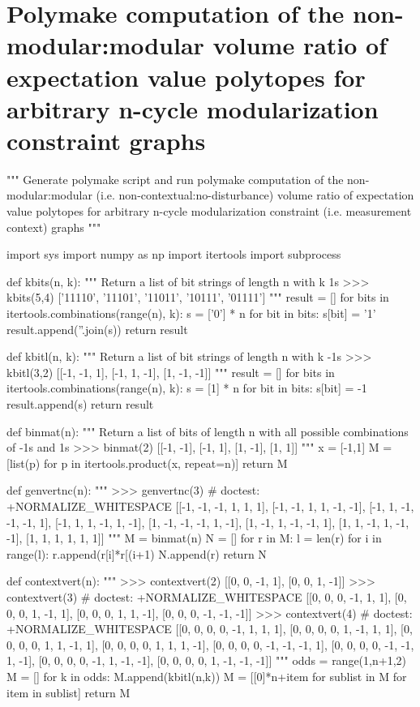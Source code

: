 \documentclass[10pt]{article}
\begin{document}
\section*{Polymake computation of the non-modular:modular volume ratio of expectation value polytopes for arbitrary n-cycle modularization constraint graphs}
\begin{python}
"""
Generate polymake script and run polymake computation of the
non-modular:modular (i.e. non-contextual:no-disturbance) volume ratio
of expectation value polytopes for arbitrary n-cycle modularization
constraint (i.e. measurement context) graphs
"""

import sys
import numpy as np
import itertools
import subprocess

def kbits(n, k):
    """
    Return a list of bit strings of length n with k 1s
    >>> kbits(5,4)
    ['11110', '11101', '11011', '10111', '01111']
    """
    result = []
    for bits in itertools.combinations(range(n), k):
        s = ['0'] * n
        for bit in bits:
            s[bit] = '1'
        result.append(''.join(s))
    return result

def kbitl(n, k):
    """
    Return a list of bit strings of length n with k -1s
    >>> kbitl(3,2)
    [[-1, -1, 1], [-1, 1, -1], [1, -1, -1]]
    """
    result = []
    for bits in itertools.combinations(range(n), k):
        s = [1] * n
        for bit in bits:
            s[bit] = -1
        result.append(s)
    return result

def binmat(n):
    """
    Return a list of bits of length n with all possible
    combinations of -1s and 1s
    >>> binmat(2)
    [[-1, -1], [-1, 1], [1, -1], [1, 1]]
    """
    x = [-1,1]
    M = [list(p) for p in itertools.product(x, repeat=n)]
    return M

def genvertnc(n):
    """
    >>> genvertnc(3) # doctest: +NORMALIZE_WHITESPACE
    [[-1, -1, -1, 1, 1, 1], [-1, -1, 1, 1, -1, -1],
    [-1, 1, -1, -1, -1, 1], [-1, 1, 1, -1, 1, -1],
    [1, -1, -1, -1, 1, -1], [1, -1, 1, -1, -1, 1],
    [1, 1, -1, 1, -1, -1], [1, 1, 1, 1, 1, 1]]
    """
    M = binmat(n)
    N = []
    for r in M:
        l = len(r)
        for i in range(l):
            r.append(r[i]*r[(i+1) %
        N.append(r)
    return N

def contextvert(n):
    """
    >>> contextvert(2)
    [[0, 0, -1, 1], [0, 0, 1, -1]]
    >>> contextvert(3) # doctest: +NORMALIZE_WHITESPACE
    [[0, 0, 0, -1, 1, 1], [0, 0, 0, 1, -1, 1],
    [0, 0, 0, 1, 1, -1], [0, 0, 0, -1, -1, -1]]
    >>> contextvert(4) # doctest: +NORMALIZE_WHITESPACE
    [[0, 0, 0, 0, -1, 1, 1, 1], [0, 0, 0, 0, 1, -1, 1, 1],
    [0, 0, 0, 0, 1, 1, -1, 1], [0, 0, 0, 0, 1, 1, 1, -1],
    [0, 0, 0, 0, -1, -1, -1, 1], [0, 0, 0, 0, -1, -1, 1, -1],
    [0, 0, 0, 0, -1, 1, -1, -1], [0, 0, 0, 0, 1, -1, -1, -1]]
    """
    odds = range(1,n+1,2)
    M = []
    for k in odds:
        M.append(kbitl(n,k))
    M = [[0]*n+item for sublist in M for item in sublist]
    return M


\end{python}
\end{document}
